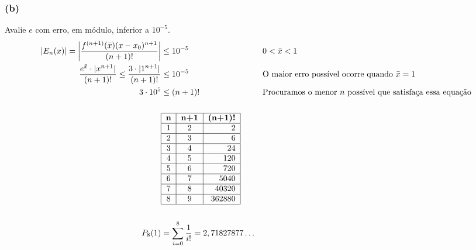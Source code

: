 \documentclass{article}
\begin{document}
\subsubsection{(b)}
Avalie $e$ com erro, em módulo, inferior a $10^{-5}$.
\begin{align}
  |E_n(x)|
  = \left| \frac{f^{(n+1)}(\bar{x})(x-x_0)^{n+1}}{(n + 1)!} \right|
  &\leq 10^{-5}
  && 0 < \bar{x} < 1 \\
  \frac{e^{\bar{x}} \cdot |x^{n+1}|}{(n + 1)!}
  \leq \frac{3 \cdot |1^{n+1}|}{(n + 1)!}
  &\leq 10^{-5}
  && \text{O maior erro possível ocorre quando $\bar{x} = 1$} \notag \\
  3 \cdot 10^5
  &\leq (n + 1)!
  && \text{Procuramos o menor $n$ possível que satisfaça essa equação} \notag \\
  \notag \\
  &
  \begin{tabular}{| c | c | r |}
    \hline
    \textbf{n} & \textbf{n+1} & \textbf{(n+1)!}  \\ \hline
            1  &         2    &            2     \\ \hline
            2  &         3    &            6     \\ \hline
            3  &         4    &           24     \\ \hline
            4  &         5    &          120     \\ \hline
            5  &         6    &          720     \\ \hline
            6  &         7    &         5040     \\ \hline
            7  &         8    &        40320     \\ \hline
            8  &         9    &       362880     \\ \hline
  \end{tabular} \notag \\
  \notag \\
  P_8(1)
  &= \sum_{i = 0}^8 \frac{1}{i!}
  = 2,71827877 \dots
\end{align}
\setcounter{equation}{0}
\clearpage

\end{document}
